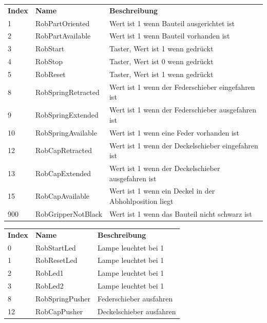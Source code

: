 \documentclass[11pt,a4paper,ngerman]{article}
\begin{document}
\begin{center}
	\setlength\extrarowheight{4pt}
	\small
	\begin{tabularx}{\textwidth}{|p{1cm}|p{4cm}|X|}
		\hline
		\rowcolor{tublau}
		\multicolumn{3}{|c|}{\bf \color{white} \large Sensoren}\\
		\hline\hline
		\rowcolor{gray!80}
		\bf Index & \bf Name & \bf Beschreibung\\
		\hline\hline
		1 & RobPartOriented & Wert ist 1 wenn Bauteil ausgerichtet ist\\
		2 & RobPartAvailable & Wert ist 1 wenn Bauteil vorhanden ist\\
		3 & RobStart & Taster, Wert ist 1 wenn gedrückt\\
		4 & RobStop & Taster, Wert ist 0 wenn gedrückt\\
		5 & RobReset & Taster, Wert ist 1 wenn gedrückt\\
		8 & RobSpringRetracted & Wert ist 1 wenn der Federschieber eingefahren ist\\
		9 & RobSpringExtended & Wert ist 1 wenn der Federschieber ausgefahren ist\\
		10 & RobSpringAvailable & Wert ist 1 wenn eine Feder vorhanden ist\\
		12 & RobCapRetracted & Wert ist 1 wenn der Deckelschieber eingefahren ist\\
		13 & RobCapExtended & Wert ist 1 wenn der Deckelschieber ausgefahren ist\\
		15 & RobCapAvailable & Wert ist 1 wenn ein Deckel in der Abhohlposition liegt\\
		900 & RobGripperNotBlack & Wert ist 1 wenn das Bauteil nicht schwarz ist\\
		\hline
	\end{tabularx}
	
	\medskip
	
	\begin{tabularx}{\textwidth}{|p{1cm}|p{4cm}|X|}
		\hline
		\rowcolor{tublau}
		\multicolumn{3}{|c|}{\bf \color{white} \large Aktoren}\\
		\hline\hline
		\rowcolor{gray!80}
		\bf Index & \bf Name & \bf Beschreibung\\
		\hline\hline
		0 & RobStartLed & Lampe leuchtet bei 1\\
		1 & RobResetLed & Lampe leuchtet bei 1\\
		2 & RobLed1 & Lampe leuchtet bei 1\\
		3 & RobLed2 & Lampe leuchtet bei 1\\
		8 & RobSpringPusher & Federschieber ausfahren\\
		12 & RobCapPusher & Deckelschieber ausfahren\\
		\hline
	\end{tabularx}
\end{center}
\end{document}
